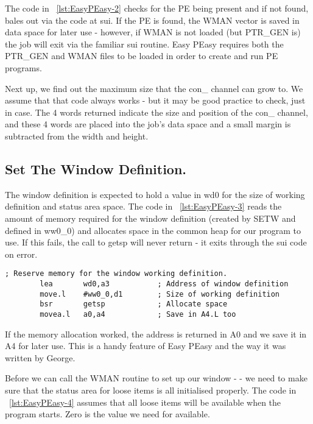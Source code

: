 The code in \lstlistingname~\ref{lst:EasyPEasy-2} checks for the PE being present and if not found,
      bales out via the code at sui. If the PE is found, the WMAN vector is
      saved in data space for later use -{} however, if WMAN is not loaded (but
      PTR\_GEN is) the job will exit via the familiar sui routine. Easy PEasy
      requires both the PTR\_GEN and WMAN files to be loaded in order to
      create and run PE programs.

Next up, we find out the maximum size that the con\_ channel can
      grow to. We assume that that code always works -{} but it may be good
      practice to check, just in case. The 4 words returned indicate the size
      and position of the con\_ channel, and these 4 words are placed into the
      job's data space and a small margin is subtracted from the width and
      height.

\subsection{Set The Window Definition.}

The window definition is expected to hold a value in wd0 for the
      size of working definition and status area space. The code in \lstlistingname~\ref{lst:EasyPEasy-3} reads
      the amount of memory required for the window definition (created by SETW
      and defined in ww0\_0) and allocates space in the common heap for our
      program to use. If this fails, the call to getsp will never return -{} it
      exits through the sui code on error.

\begin{lstlisting}[firstnumber=last,caption={EasyPEasy Standard Code - Allocate Memory for the Window Definition},label={lst:EasyPEasy-3}]
; Reserve memory for the window working definition.
        lea       wd0,a3           ; Address of window definition
        move.l    #ww0_0,d1        ; Size of working definition
        bsr       getsp            ; Allocate space
        movea.l   a0,a4            ; Save in A4.L too
\end{lstlisting}

If the memory allocation worked, the address is returned in A0 and
      we save it in A4 for later use. This is a handy feature of Easy PEasy
      and the way it was written by George.

Before we can call the WMAN routine to set up our window -{}
       -{} we need to make sure that the status area for loose items is
      all initialised properly. The code in \lstlistingname~\ref{lst:EasyPEasy-4} assumes that all loose
      items will be available when the program starts. Zero is the value we
      need for available.

